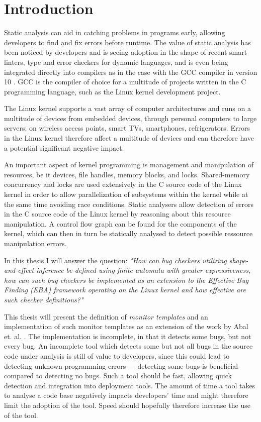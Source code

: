 \section{Introduction}

\newpar Static analysis can aid in catching problems in programs early, allowing developers to find and fix errors before runtime. The value of static analysis has been noticed by developers and is seeing adoption in the shape of recent smart linters, type and error checkers for dynamic languages, and is even being integrated directly into compilers as in the case with the GCC compiler in version 10 \cite{gcc10}. GCC is the compiler of choice for a multitude of projects written in the C programming language, such as the Linux kernel development project. 

\newpar The Linux kernel supports a vast array of computer architectures and runs on a multitude of devices from embedded devices, through personal computers to large servers; on wireless access points, smart TVs, smartphones, refrigerators. Errors in the Linux kernel therefore affect a multitude of devices and can therefore have a potential significant negative impact.

\newpar An important aspect of kernel programming is management and manipulation of resources, be it devices, file handles, memory blocks, and locks. Shared-memory concurrency and locks are used extensively in the C source code of the Linux kernel in order to allow parallelization of subsystems within the kernel while at the same time avoiding race conditions. Static analysers allow detection of errors in the C source code of the Linux kernel by reasoning about this resource manipulation. A control flow graph can be found for the components of the kernel, which can then in turn be statically analysed to detect possible ressource manipulation errors. 

\newpar In this thesis I will answer the question: \textit{"How can bug checkers utilizing shape-and-effect inference be defined using finite automata with greater expressiveness, how can such bug checkers be implemented as an extension to the Effective Bug Finding (EBA) framework operating on the Linux kernel and how effective are such checker definitions?"}

\newpar This thesis will present the definition of \textit{monitor templates} and an implementation of such monitor templates as an extension of the work by Abal et. al. \cite{Abal2017EffectiveBF}. The implementation is incomplete, in that it detects some bugs, but not every bug. An incomplete tool which detects some but not all bugs in the source code under analysis is still of value to developers, since this could lead to detecting unknown programming errors --- detecting some bugs is beneficial compared to detecting no bugs. Such a tool should be fast, allowing quick detection and integration into deployment tools. The amount of time a tool takes to analyse a code base negatively impacts developers' time and might therefore limit the adoption of the tool. Speed should hopefully therefore increase the use of the tool. 

